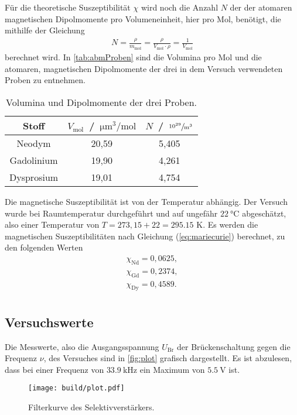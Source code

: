 \noindent
Für die theoretische Suszeptibilität $\chi$ wird noch die Anzahl $N$ der der atomaren magnetischen Dipolmomente pro Volumeneinheit, hier pro Mol, benötigt, die mithilfe der Gleichung 
\begin{align*}
  N = \frac{\rho}{m_{\text{mol}}} = \frac{\rho}{V_{\text{mol}} \cdot \rho} = \frac{1}{V_{\text{mol}}} %
\end{align*}
berechnet wird.
In \autoref{tab:abmProben} sind die Volumina pro Mol und die atomaren, magnetischen Dipolmomente der drei in dem Versuch verwendeten Proben zu entnehmen.
\begin{table}[H]
  \centering
  \caption{Volumina und Dipolmomente der drei Proben.}
  \label{tab:abmProben}
  \begin{tabular}{c|c c}
    \toprule
    Stoff & $V_{\text{mol}}$ \,/\, $\si{\micro\cubic\meter\per\mole}$ & $N$ \,/\, $\sfrac{10^{29}}{\si{\cubic\meter}}$ \\
    \midrule
    Neodym & 20,59 & 5,405 \\
    Gadolinium & 19,90 & 4,261 \\
    Dysprosium & 19,01 & 4,754 \\
    \bottomrule
  \end{tabular}
\end{table}

\noindent
Die magnetische Suszeptibilität ist von der Temperatur abhängig. Der Versuch wurde bei Raumtemperatur durchgeführt und auf ungefähr $\SI{22}{\degreeCelsius}$ abgeschätzt, also einer Temperatur von $T = 273,15 + 22 = 295.15$ K.
Es werden die magnetischen Suszeptibilitäten nach Gleichung (\ref{eq:mariecurie}) berechnet, zu den folgenden Werten
\begin{align*}
  \chi_{\text{Nd}} = 0,0625,  \\
  \chi_{\text{Gd}} = 0,2374, \\
  \chi_{\text{Dy}} = 0,4589. \\
\end{align*}






\subsection{Versuchswerte}
\label{subsec:versuchsW}
Die Messwerte, also die Ausgangsspannung $U_{\text{Br}}$ der Brückenschaltung gegen die Frequenz $\nu$, des Versuches sind in \autoref{fig:plot} grafisch dargestellt.
Es ist abzulesen, dass bei einer Frequenz von $\SI{33,9}{\kilo\hertz}$ ein Maximum von $\SI{5,5}{\volt}$ ist. 
\begin{figure}[H]
  \centering
  \texttt{[image: build/plot.pdf]}
  \caption{Filterkurve des Selektivverstärkers.}
  \label{fig:plot}
\end{figure}

